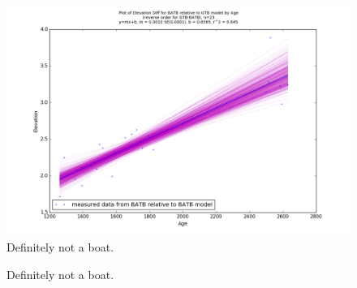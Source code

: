 \documentclass{article}
\begin{document}
\begin{figure}[h]
	\includegraphics[width=\linewidth]{data/gias/theGIA_BATB_relative_to_GTB.png}
	\caption{Definitely not a boat.}
	\label{fig:gias_BATBxGTB}
\end{figure}
\newpage









\begin{figure}[h]
	\caption{Definitely not a boat.}
	\label{fig:data_GTBxATB}
\end{figure}
\newpage
\end{document}
